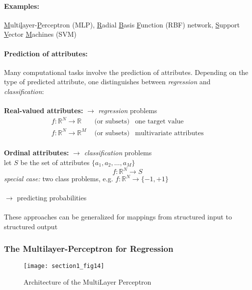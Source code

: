 \paragraph{Examples:} \underline{M}ulti\underline{l}ayer-\underline{P}erceptron (MLP), \underline{R}adial \underline{B}asis \underline{F}unction (RBF) network, \underline{S}upport \underline{V}ector \underline{M}achines (SVM) 

\paragraph{Prediction of attributes:} Many computational tasks involve the prediction of attributes. Depending on the type of predicted attribute, one distinguishes between \emph{regression} and \emph{classification}:
\\\\ 
\indent\textbf{Real-valued attributes:} $\rightarrow$ \emph{regression} problems
\begin{equation}
\begin{array}{lll}
	f: \mathbb{R}^N \rightarrow \mathbb{R} 
		& \text{ (or subsets)} 
		& \text{one target value} \\
	f: \mathbb{R}^N \rightarrow \mathbb{R}^M 
		& \text{ (or subsets)} 
		& \text{multivariate attributes}
              \end{array}
\end{equation}           
\\   
\indent \textbf{Ordinal attributes:} $\rightarrow$ \emph{classification} problems\\
              \indent let $S$ be the set of attributes $\{ a_1, a_2, \ldots, a_M \}$ 
              \[ f: \mathbb{R}^N \rightarrow S \]
              \indent \emph{special case:} two class problems, e.g. $f: \mathbb{R}^N \rightarrow \{-1, +1\}$\\\\
              \indent $\rightarrow$ predicting probabilities
              \\\\
              These approaches can be generalized for mappings from
              structured input to structured output


\subsubsection{The Multilayer-Perceptron for Regression}
\begin{figure}[h]
  \centering
\texttt{[image: section1\_fig14]} 
  \caption{Architecture of the MultiLayer Perceptron}
 \label{fig:MLP}
\end{figure}

